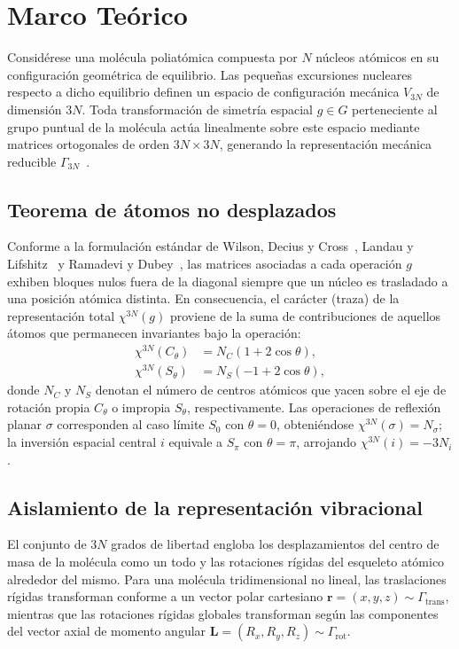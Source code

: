 \section{Marco Teórico}
\label{sec:theory}
Considérese una molécula poliatómica compuesta por $N$ núcleos atómicos en su configuración geométrica de equilibrio. Las pequeñas excursiones nucleares respecto a dicho equilibrio definen un espacio de configuración mecánica $V_{3N}$ de dimensión $3N$. Toda transformación de simetría espacial $g \in G$ perteneciente al grupo puntual de la molécula actúa linealmente sobre este espacio mediante matrices ortogonales de orden $3N \times 3N$, generando la representación mecánica reducible $\Gamma_{3N}$~\cite{Ramadevi2019}.

\subsection{Teorema de átomos no desplazados}
Conforme a la formulación estándar de Wilson, Decius y Cross~\cite{Wilson1955}, Landau y Lifshitz~\cite{LandauMechanics} y Ramadevi y Dubey~\cite{Ramadevi2019}, las matrices asociadas a cada operación $g$ exhiben bloques nulos fuera de la diagonal siempre que un núcleo es trasladado a una posición atómica distinta. En consecuencia, el carácter (traza) de la representación total $\chi^{3N}(g)$ proviene de la suma de contribuciones de aquellos átomos que permanecen invariantes bajo la operación:
\begin{align}
\chi^{3N}(C_\theta) &= N_C (1 + 2\cos\theta), \label{eq:unshifted_C} \\
\chi^{3N}(S_\theta) &= N_S (-1 + 2\cos\theta), \label{eq:unshifted_S}
\end{align}
donde $N_C$ y $N_S$ denotan el número de centros atómicos que yacen sobre el eje de rotación propia $C_\theta$ o impropia $S_\theta$, respectivamente. Las operaciones de reflexión planar $\sigma$ corresponden al caso límite $S_0$ con $\theta = 0$, obteniéndose $\chi^{3N}(\sigma) = N_\sigma$; la inversión espacial central $i$ equivale a $S_\pi$ con $\theta = \pi$, arrojando $\chi^{3N}(i) = -3N_i$.

\subsection{Aislamiento de la representación vibracional}
El conjunto de $3N$ grados de libertad engloba los desplazamientos del centro de masa de la molécula como un todo y las rotaciones rígidas del esqueleto atómico alrededor del mismo. Para una molécula tridimensional no lineal, las traslaciones rígidas transforman conforme a un vector polar cartesiano $\mathbf{r} = (x, y, z) \sim \Gamma_{\text{trans}}$, mientras que las rotaciones rígidas globales transforman según las componentes del vector axial de momento angular $\mathbf{L} = (R_x, R_y, R_z) \sim \Gamma_{\text{rot}}$.

